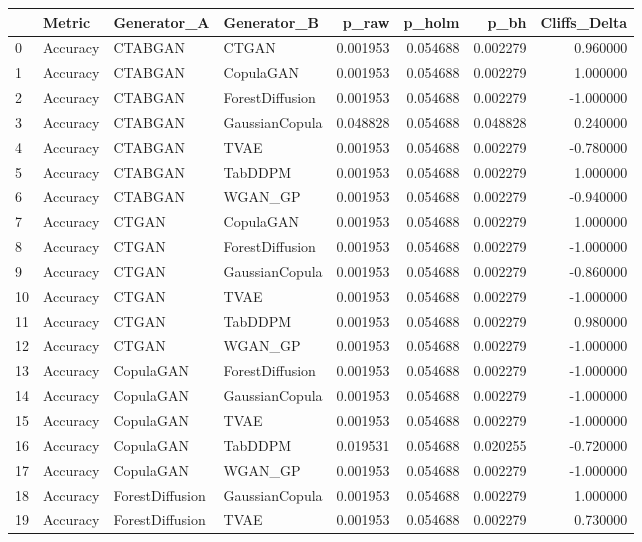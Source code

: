 \begin{tabular}{llllrrrr}
\toprule
 & Metric & Generator_A & Generator_B & p_raw & p_holm & p_bh & Cliffs_Delta \\
\midrule
0 & Accuracy & CTABGAN & CTGAN & 0.001953 & 0.054688 & 0.002279 & 0.960000 \\
1 & Accuracy & CTABGAN & CopulaGAN & 0.001953 & 0.054688 & 0.002279 & 1.000000 \\
2 & Accuracy & CTABGAN & ForestDiffusion & 0.001953 & 0.054688 & 0.002279 & -1.000000 \\
3 & Accuracy & CTABGAN & GaussianCopula & 0.048828 & 0.054688 & 0.048828 & 0.240000 \\
4 & Accuracy & CTABGAN & TVAE & 0.001953 & 0.054688 & 0.002279 & -0.780000 \\
5 & Accuracy & CTABGAN & TabDDPM & 0.001953 & 0.054688 & 0.002279 & 1.000000 \\
6 & Accuracy & CTABGAN & WGAN_GP & 0.001953 & 0.054688 & 0.002279 & -0.940000 \\
7 & Accuracy & CTGAN & CopulaGAN & 0.001953 & 0.054688 & 0.002279 & 1.000000 \\
8 & Accuracy & CTGAN & ForestDiffusion & 0.001953 & 0.054688 & 0.002279 & -1.000000 \\
9 & Accuracy & CTGAN & GaussianCopula & 0.001953 & 0.054688 & 0.002279 & -0.860000 \\
10 & Accuracy & CTGAN & TVAE & 0.001953 & 0.054688 & 0.002279 & -1.000000 \\
11 & Accuracy & CTGAN & TabDDPM & 0.001953 & 0.054688 & 0.002279 & 0.980000 \\
12 & Accuracy & CTGAN & WGAN_GP & 0.001953 & 0.054688 & 0.002279 & -1.000000 \\
13 & Accuracy & CopulaGAN & ForestDiffusion & 0.001953 & 0.054688 & 0.002279 & -1.000000 \\
14 & Accuracy & CopulaGAN & GaussianCopula & 0.001953 & 0.054688 & 0.002279 & -1.000000 \\
15 & Accuracy & CopulaGAN & TVAE & 0.001953 & 0.054688 & 0.002279 & -1.000000 \\
16 & Accuracy & CopulaGAN & TabDDPM & 0.019531 & 0.054688 & 0.020255 & -0.720000 \\
17 & Accuracy & CopulaGAN & WGAN_GP & 0.001953 & 0.054688 & 0.002279 & -1.000000 \\
18 & Accuracy & ForestDiffusion & GaussianCopula & 0.001953 & 0.054688 & 0.002279 & 1.000000 \\
19 & Accuracy & ForestDiffusion & TVAE & 0.001953 & 0.054688 & 0.002279 & 0.730000 \\

\end{tabular}
